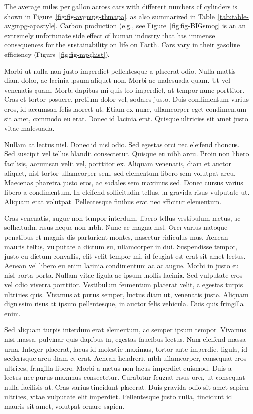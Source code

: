 \documentclass[
  english,
  man,floatsintext]{apa6}
\begin{document}
The average miles per gallon across cars with different numbers of cylinders is shown in Figure~\ref{fig:fig-avgmpg-thmapa}, as also summarized in Table~\ref{tab:table-avgmpg-apastyle}. Carbon production (e.g., see Figure~\ref{fig:fig-BIGsmog} is an an extremely unfortunate side effect of human industry that has immense consequences for the sustainability on life on Earth. Cars vary in their gasoline efficiency (Figure~\ref{fig:fig-mpghist}).

Morbi ut nulla non justo imperdiet pellentesque a placerat odio. Nulla mattis diam dolor, ac lacinia ipsum aliquet non. Morbi ac malesuada quam. Ut vel venenatis quam. Morbi dapibus mi quis leo imperdiet, at tempor nunc porttitor. Cras et tortor posuere, pretium dolor vel, sodales justo. Duis condimentum varius eros, id accumsan felis laoreet ut. Etiam ex nunc, ullamcorper eget condimentum sit amet, commodo eu erat. Donec id lacinia erat. Quisque ultricies sit amet justo vitae malesuada.

Nullam at lectus nisl. Donec id nisl odio. Sed egestas orci nec eleifend rhoncus. Sed suscipit vel tellus blandit consectetur. Quisque eu nibh arcu. Proin non libero facilisis, accumsan velit vel, porttitor ex. Aliquam venenatis, diam et auctor aliquet, nisl tortor ullamcorper sem, sed elementum libero sem volutpat arcu. Maecenas pharetra justo eros, ac sodales sem maximus sed. Donec cursus varius libero a condimentum. In eleifend sollicitudin tellus, in gravida risus vulputate ut. Aliquam erat volutpat. Pellentesque finibus erat nec efficitur elementum.

Cras venenatis, augue non tempor interdum, libero tellus vestibulum metus, ac sollicitudin risus neque non nibh. Nunc ac magna nisl. Orci varius natoque penatibus et magnis dis parturient montes, nascetur ridiculus mus. Aenean mauris tellus, vulputate a dictum eu, ullamcorper in dui. Suspendisse tempor, justo eu dictum convallis, elit velit tempor mi, id feugiat est erat sit amet lectus. Aenean vel libero eu enim lacinia condimentum ac ac augue. Morbi in justo eu nisl porta porta. Nullam vitae ligula ac ipsum mollis lacinia. Sed vulputate eros vel odio viverra porttitor. Vestibulum fermentum placerat velit, a egestas turpis ultricies quis. Vivamus at purus semper, luctus diam ut, venenatis justo. Aliquam dignissim risus at ipsum pellentesque, in auctor felis vehicula. Duis quis fringilla enim.

Sed aliquam turpis interdum erat elementum, ac semper ipsum tempor. Vivamus nisi massa, pulvinar quis dapibus in, egestas faucibus lectus. Nam eleifend massa urna. Integer placerat, lacus id molestie maximus, tortor ante imperdiet ligula, id scelerisque arcu diam et erat. Aenean hendrerit nibh ullamcorper, consequat eros ultrices, fringilla libero. Morbi a metus non lacus imperdiet euismod. Duis a lectus nec purus maximus consectetur. Curabitur feugiat risus orci, ut consequat nulla facilisis at. Cras varius tincidunt placerat. Duis gravida odio sit amet sapien ultrices, vitae vulputate elit imperdiet. Pellentesque justo nulla, tincidunt id mauris sit amet, volutpat ornare sapien.
\end{document}
